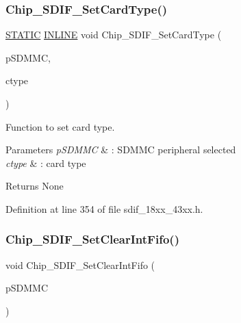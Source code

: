 \subsubsection{\texorpdfstring{Chip\+\_\+\+S\+D\+I\+F\+\_\+\+Set\+Card\+Type()}{Chip\_SDIF\_SetCardType()}}
{\footnotesize\ttfamily \hyperlink{group___l_p_c___types___public___macros_ga10b2d890d871e1489bb02b7e70d9bdfb}{S\+T\+A\+T\+IC} \hyperlink{spifi__18xx__43xx_8h_a2eb6f9e0395b47b8d5e3eeae4fe0c116}{I\+N\+L\+I\+NE} void Chip\+\_\+\+S\+D\+I\+F\+\_\+\+Set\+Card\+Type (\begin{DoxyParamCaption}\item[{\hyperlink{struct_l_p_c___s_d_m_m_c___t}{L\+P\+C\+\_\+\+S\+D\+M\+M\+C\+\_\+T} $\ast$}]{p\+S\+D\+M\+MC,  }\item[{uint32\+\_\+t}]{ctype }\end{DoxyParamCaption})}



Function to set card type. 


\begin{DoxyParams}{Parameters}
{\em p\+S\+D\+M\+MC} & \+: S\+D\+M\+MC peripheral selected \\
\hline
{\em ctype} & \+: card type \\
\hline
\end{DoxyParams}
\begin{DoxyReturn}{Returns}
None 
\end{DoxyReturn}


Definition at line 354 of file sdif\+\_\+18xx\+\_\+43xx.\+h.

\mbox{\label{group___s_d_i_f__18_x_x__43_x_x_ga8b2559327fedf08efe8a5e87ba6f6e54}} 
\subsubsection{\texorpdfstring{Chip\+\_\+\+S\+D\+I\+F\+\_\+\+Set\+Clear\+Int\+Fifo()}{Chip\_SDIF\_SetClearIntFifo()}}
{\footnotesize\ttfamily void Chip\+\_\+\+S\+D\+I\+F\+\_\+\+Set\+Clear\+Int\+Fifo (\begin{DoxyParamCaption}\item[{\hyperlink{struct_l_p_c___s_d_m_m_c___t}{L\+P\+C\+\_\+\+S\+D\+M\+M\+C\+\_\+T} $\ast$}]{p\+S\+D\+M\+MC }\end{DoxyParamCaption})}



